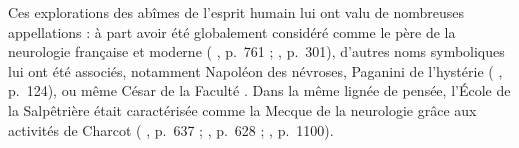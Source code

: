 

Ces explorations des abîmes de l'esprit humain lui ont valu de nombreuses appellations : à part avoir été globalement considéré comme le père de la neurologie française et moderne (\citeauthor{teive2022thomas} \citeyear{teive2022thomas}, p.~761 ; \citeauthor{broussolle2012} \citeyear{broussolle2012}, p.~301), d'autres noms symboliques lui ont été associés, notamment \og{}Napoléon des névroses\fg{}, \og{}Paganini de l'hystérie\fg{} 
(\citeauthor{mirbeau1995chroniques} \citeyear{mirbeau1995chroniques}, p.~124), ou même \og{}César de la Faculté\fg{} \citep[p.~1109]{camargo2024}. Dans la même lignée de pensée, l'École de la Salpêtrière était caractérisée comme la \og{}Mecque de la neurologie\fg{} grâce aux activités de Charcot (\citeauthor{teive2014126} \citeyear{teive2014126}, p.~637 ; \citeauthor{GOETZ2017628} \citeyear{GOETZ2017628}, p.~628 ; \citeauthor{camargo2024} \citeyear{camargo2024}, p.~1100). 


